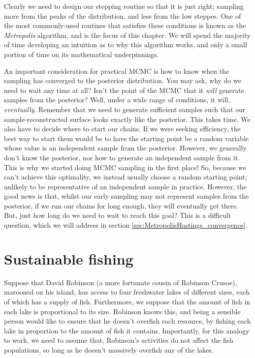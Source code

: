 \documentclass[11pt,fullpage]{book}
\begin{document}
Clearly we need to design our stepping routine so that it is just right; sampling more from the peaks of the distribution, and less from the low steppes. One of the most commonly-used routines that satisfies these conditions is known as the \textit{Metropolis} algorithm, and is the focus of this chapter. We will spend the majority of time developing an intuition as to why this algorithm works, and only a small portion of time on its mathematical underpinnings.

An important consideration for practical MCMC is how to know when the sampling has converged to the posterior distribution. You may ask, why do we need to wait any time at all? Isn't the point of the MCMC that it \textit{will} generate samples from the posterior? Well, under a wide range of conditions, it will, \textit{eventually}. Remember that we need to generate sufficient samples such that our sample-reconstructed surface looks exactly like the posterior. This takes time. We also have to decide where to start our chains. If we were seeking efficiency, the best way to start them would be to have the starting point be a random variable whose value is an independent sample from the posterior. However, we generally don't know the posterior, nor how to generate an independent sample from it. This is why we started doing MCMC sampling in the first place! So, because we can't achieve this optimality, we instead usually choose a random starting point; unlikely to be representative of an independent sample in practice. However, the good news is that, whilst our early sampling may not represent samples from the posterior, if we run our chains for long enough, they will eventually get there. But, just how long do we need to wait to reach this goal? This is a difficult question, which we will address in section \ref{sec:MetropolisHastings_convergence}.

\section{Sustainable fishing}
Suppose that David Robinson (a more fortunate cousin of Robinson Crusoe), marooned on his island, has access to four freshwater lakes of different sizes, each of which has a supply of fish. Furthermore, we suppose that the amount of fish in each lake is proportional to its size. Robinson knows this, and being a sensible person would like to ensure that he doesn't overfish each resource, by fishing each lake in proportion to the amount of fish it contains. Importantly, for this analogy to work, we need to assume that, Robinson's activities do not affect the fish populations, so long as he doesn't massively overfish any of the lakes. 
\end{document}
